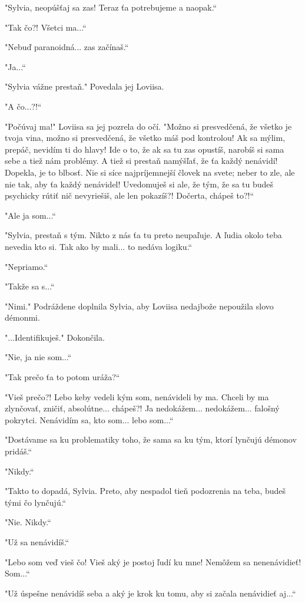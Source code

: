 \documentclass{book}
\begin{document}
"$ $Sylvia, neopúšťaj sa zas! Teraz ťa potrebujeme a naopak.“

"$ $Tak čo?! Všetci ma...“

"$ $Nebuď paranoidná... zas začínaš.“

"$ $Ja...“

"$ $Sylvia vážne prestaň."$ $ Povedala jej Loviisa.

"$ $A čo...?!“

"$ $Počúvaj ma!"$ $ Loviisa sa jej pozrela do očí. "$ $Možno si presvedčená, že všetko je tvoja vina, možno si presvedčená, že všetko máš pod kontrolou! Ak sa mýlim, prepáč, nevidím ti do hlavy! Ide o to, že ak sa tu zas opustíš, narobíš si sama sebe a tiež nám problémy. A tiež si prestaň namýšľať, že ťa každý nenávidí! Dopekla, je to blbosť. Nie si síce najpríjemnejší človek na svete; neber to zle, ale nie tak, aby ťa každý nenávidel! Uvedomuješ si ale, že tým, že sa tu budeš psychicky rútiť nič nevyriešiš, ale len pokazíš?! Dočerta, chápeš to?!“

"$ $Ale ja som...“

"$ $Sylvia, prestaň s tým. Nikto z nás ťa tu preto neupaľuje. A ľudia okolo teba nevedia kto si. Tak ako by mali... to nedáva logiku.“

"$ $Nepriamo.“

"$ $Takže sa s...“

"$ $Nimi."$ $ Podráždene doplnila Sylvia, aby Loviisa nedajbože nepoužila slovo démonmi.

"$ $...Identifikuješ."$ $ Dokončila.

"$ $Nie, ja nie som...“

"$ $Tak prečo ťa to potom uráža?“

"$ $Vieš prečo?! Lebo keby vedeli kým som, nenávideli by ma. Chceli by ma zlynčovať, zničiť, absolútne... chápeš?! Ja nedokážem... nedokážem... falošný pokrytci. Nenávidím sa, kto som... lebo som...“

"$ $Dostávame sa ku problematiky toho, že sama sa ku tým, ktorí lynčujú démonov pridáš.“

"$ $Nikdy.“

"$ $Takto to dopadá, Sylvia. Preto, aby nespadol tieň podozrenia na teba, budeš tými čo lynčujú.“

"$ $Nie. Nikdy.“

"$ $Už sa nenávidíš.“

"$ $Lebo som veď vieš čo! Vieš aký je postoj ľudí ku mne! Nemôžem sa nenenávidieť! Som...“

"$ $Už úspešne nenávidíš seba a aký je krok ku tomu, aby si začala nenávidieť aj...“
\end{document}
